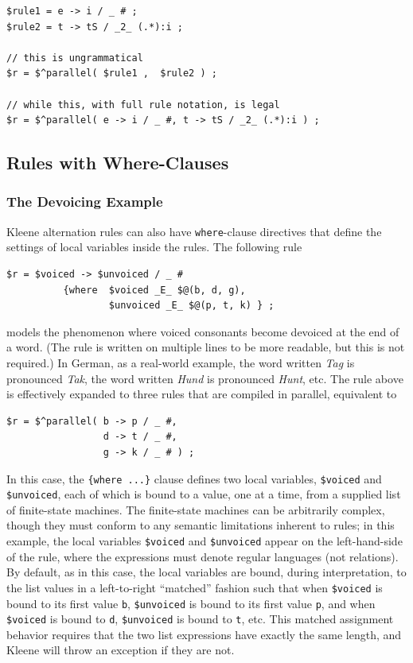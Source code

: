 \begin{Verbatim}
$rule1 = e -> i / _ # ;
$rule2 = t -> tS / _2_ (.*):i ;

// this is ungrammatical
$r = $^parallel( $rule1 ,  $rule2 ) ;

// while this, with full rule notation, is legal
$r = $^parallel( e -> i / _ #, t -> tS / _2_ (.*):i ) ;
\end{Verbatim}

\subsection{Rules with Where-Clauses}

\subsubsection{The Devoicing Example}

Kleene alternation rules can also have \texttt{where}-clause directives that define the settings of local variables inside the rules.  The following rule

\begin{Verbatim}
$r = $voiced -> $unvoiced / _ # 
          {where  $voiced _E_ $@(b, d, g), 
                  $unvoiced _E_ $@(p, t, k) } ;
\end{Verbatim}

\noindent
models the phenomenon where voiced consonants become devoiced at the end of a word.  
(The rule is written on multiple lines to be
more readable, but this is not required.) In German, as a real-world example, the word
written \emph{Tag} is pronounced \emph{Tak}, the word written \emph{Hund} is pronounced
\emph{Hunt}, etc.  The rule above is effectively expanded to
three rules that are compiled in parallel, equivalent to

\begin{Verbatim}
$r = $^parallel( b -> p / _ #, 
                 d -> t / _ #, 
                 g -> k / _ # ) ;
\end{Verbatim}

\noindent
In this case, the \texttt{\{where ...\}} clause defines two local variables,
\verb!$voiced! and \verb!$unvoiced!, each of which is bound to a value, one at a
time, from a supplied list of finite-state machines.  The finite-state machines can be
arbitrarily complex, though they must conform to any semantic limitations
inherent to rules; in this example, the local variables \verb!$voiced! and \verb!$unvoiced! appear on
the left-hand-side of the rule, where the expressions must denote regular
languages (not relations).  By default, as in this case, the local variables are
bound, during interpretation, to the list values in a left-to-right ``matched''
fashion such that when \verb!$voiced! is bound to its first value \verb!b!,
\verb!$unvoiced! is
bound to its first value \verb!p!, and when \verb!$voiced! is bound to \verb!d!,
\verb!$unvoiced!
is bound to \verb!t!, etc.  This matched assignment behavior requires that the
two list expressions have exactly the same length, and Kleene will throw an
exception if they are not.  

